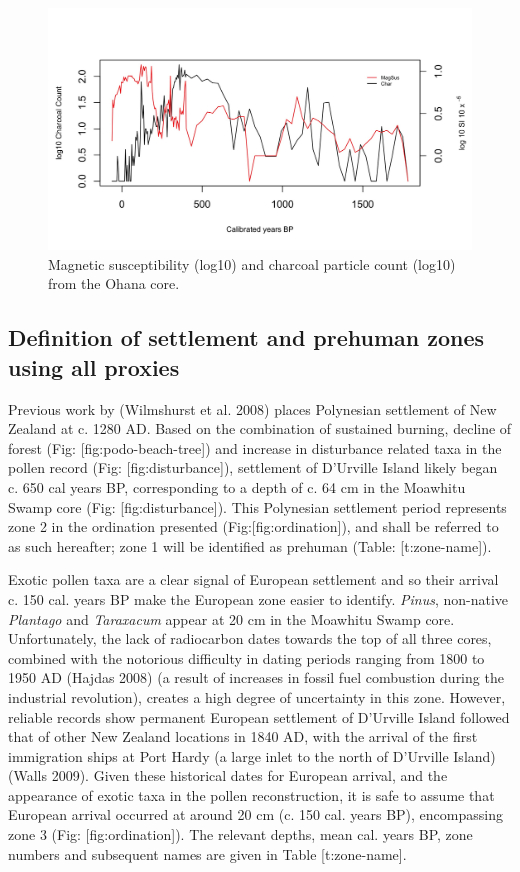\begin{figure}
\centering
\includegraphics{mag-sus-ohana.jpeg}
\caption{Magnetic susceptibility (log10) and charcoal particle count
(log10) from the Ohana core.{}}
\end{figure}

\subsection{Definition of settlement and prehuman zones using all
proxies}\label{definition-of-settlement-and-prehuman-zones-using-all-proxies}

Previous work by (Wilmshurst et al. 2008) places Polynesian settlement
of New Zealand at c. 1280 AD. Based on the combination of sustained
burning, decline of forest (Fig: {[}fig:podo-beach-tree{]}) and increase
in disturbance related taxa in the pollen record (Fig:
{[}fig:disturbance{]}), settlement of D'Urville Island likely began c.
650 cal years BP, corresponding to a depth of c. 64 cm in the Moawhitu
Swamp core (Fig: {[}fig:disturbance{]}). This Polynesian settlement
period represents zone 2 in the ordination presented
(Fig:{[}fig:ordination{]}), and shall be referred to as such hereafter;
zone 1 will be identified as prehuman (Table: {[}t:zone-name{]}).

Exotic pollen taxa are a clear signal of European settlement and so
their arrival c. 150 cal. years BP make the European zone easier to
identify. \emph{Pinus}, non-native \emph{Plantago} and \emph{Taraxacum}
appear at 20 cm in the Moawhitu Swamp core. Unfortunately, the lack of
radiocarbon dates towards the top of all three cores, combined with the
notorious difficulty in dating periods ranging from 1800 to 1950 AD
(Hajdas 2008) (a result of increases in fossil fuel combustion during
the industrial revolution), creates a high degree of uncertainty in this
zone. However, reliable records show permanent European settlement of
D'Urville Island followed that of other New Zealand locations in 1840
AD, with the arrival of the first immigration ships at Port Hardy (a
large inlet to the north of D'Urville Island) (Walls 2009). Given these
historical dates for European arrival, and the appearance of exotic taxa
in the pollen reconstruction, it is safe to assume that European arrival
occurred at around 20 cm (c. 150 cal. years BP), encompassing zone 3
(Fig: {[}fig:ordination{]}). The relevant depths, mean cal. years BP,
zone numbers and subsequent names are given in Table {[}t:zone-name{]}.

